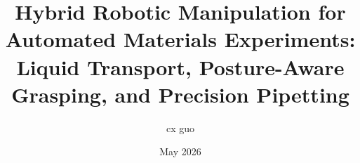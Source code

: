 \documentclass[journal,twocolumn]{IEEEtran}
\begin{document}
\title{Hybrid Robotic Manipulation for Automated Materials Experiments: Liquid Transport, Posture-Aware Grasping, and Precision Pipetting}
\author{cx guo}
\date{May 2026}

\maketitle








\end{document}
